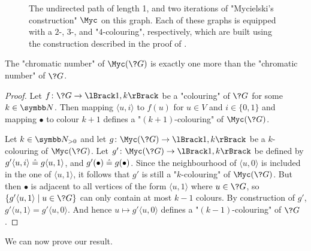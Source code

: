 \begin{figure}
	\centering
	\begin{tikzpicture}
		
	\end{tikzpicture}
	\caption{
		\AP\label{fig:Mycielski}
		The undirected path of length 1,
		and two iterations of "Mycielski's construction" $\Myc$ on this graph.
		Each of these graphs is equipped with a $2$-, $3$-, and "$4$-colouring", respectively, 
		which are built using the construction described in the proof
		of .
	}
\end{figure}

\begin{property}
	\label{prop:chromatic-number}
	The "chromatic number" of $\Myc(\?G)$
	is exactly one more than the "chromatic number" of $\?G$.
\end{property}

\begin{proof}
  Let $f\colon \?G \to \lBrack 1,k \rBrack$ be a "colouring" of $\?G$ for some $k\in \N$.
  Then mapping $\langle u, i \rangle$ to $f(u)$ for $u \in V$ and $i \in \{0,1\}$
  and mapping $\bullet$ to colour $k+1$ defines a "$(k+1)$-colouring" of $\Myc(\?G)$.

  Let $k \in \Np$ and let $g\colon \Myc(\?G) \to \lBrack 1,k\rBrack$ be a
  $k$-colouring of $\Myc(\?G)$.
  Let $g'\colon \Myc(\?G) \to \lBrack 1,k\rBrack$
  be defined by $g'\langle u,i\rangle \defeq g\langle u,1 \rangle$,
  and $g'(\bullet) \defeq g(\bullet)$.
  Since the neighbourhood of $\langle u,0 \rangle$ is included in the
  one of $\langle u,1 \rangle$, it follows that $g'$ is still a "$k$-colouring"
  of $\Myc(\?G)$. But then $\bullet$ is adjacent to all vertices of the form $\langle u, 1\rangle$
  where $u\in \?G$, so $\{g'\langle u, 1\rangle \mid u \in \?G\}$ can only contain at most $k-1$ colours.
  By construction of $g'$, $g'\langle u, 1\rangle = g'\langle u, 0\rangle$.
  And hence $u \mapsto g' \langle u,0 \rangle$ defines a "$(k-1)$-colouring" of $\?G$.
\end{proof}

We can now prove our result.

